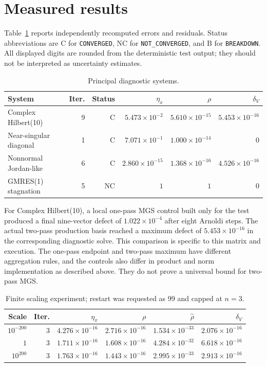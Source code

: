 \section{Measured results}

Table~\ref{tab:principal} reports independently recomputed errors and residuals.
Status abbreviations are C for \texttt{CONVERGED}, NC for
\texttt{NOT\_CONVERGED}, and B for \texttt{BREAKDOWN}. All displayed digits are
rounded from the deterministic test output; they should not be interpreted as
uncertainty estimates.

\begin{table}[H]
\centering
\small
\caption{Principal diagnostic systems.}
\label{tab:principal}
\begin{tabular}{lrrrrr}
\toprule
System & Iter. & Status & $\eta_x$ & $\rho$ & $\delta_V$ \\
\midrule
Complex Hilbert(10) & 9 & C
    & $5.473\times10^{-2}$ & $5.610\times10^{-15}$ & $5.453\times10^{-16}$ \\
Near-singular diagonal & 1 & C
    & $7.071\times10^{-1}$ & $1.000\times10^{-14}$ & $0$ \\
Nonnormal Jordan-like & 6 & C
    & $2.860\times10^{-15}$ & $1.368\times10^{-16}$ & $4.526\times10^{-16}$ \\
GMRES(1) stagnation & 5 & NC
    & $1$ & $1$ & $0$ \\
\bottomrule
\end{tabular}
\end{table}

For Complex Hilbert(10), a local one-pass MGS control built only for the test
produced a final nine-vector defect of $1.022\times10^{-4}$ after eight Arnoldi
steps. The actual two-pass production basis reached a maximum defect of
$5.453\times10^{-16}$ in the corresponding diagnostic solve. This comparison is
specific to this matrix and execution. The one-pass endpoint and two-pass maximum
have different aggregation rules, and the controls also differ in product and
norm implementation as described above. They do not prove a universal bound for
two-pass MGS.

\begin{table}[H]
\centering
\small
\caption{Finite scaling experiment; restart was requested as 99 and capped at
$n=3$.}
\label{tab:scaling}
\begin{tabular}{rrrrrr}
\toprule
Scale & Iter. & $\eta_x$ & $\rho$ & $\widehat{\rho}$ & $\delta_V$ \\
\midrule
$10^{-200}$ & 3 & $4.276\times10^{-16}$ & $2.716\times10^{-16}$
    & $1.534\times10^{-33}$ & $2.076\times10^{-16}$ \\
$1$ & 3 & $1.711\times10^{-16}$ & $1.608\times10^{-16}$
    & $4.284\times10^{-32}$ & $6.618\times10^{-16}$ \\
$10^{200}$ & 3 & $1.763\times10^{-16}$ & $1.443\times10^{-16}$
    & $2.995\times10^{-33}$ & $2.913\times10^{-16}$ \\
\bottomrule
\end{tabular}
\end{table}


